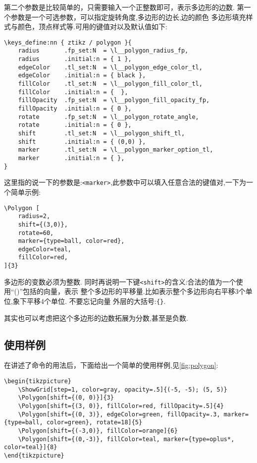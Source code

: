 \documentclass[
  hyper,    
  lang=cn,
  class=book,
  bib_index={load},
  mathSpec={envStyle=leftbar, alias},
  toc={column=2, title=目录},
]{zlatex}
\let\cmd\zlatexVerb
\newcommand{\zkey}[1]{\texttt{<#1>}}
\begin{document}
第二个参数是比较简单的，只需要输入一个正整数即可，表示多边形的边数. 第一个参数是一个可选参数，可以指定旋转角度,多边形的边长,边的颜色
多边形填充样式与颜色，顶点样式等.可用的键值对以及默认值如下:

\begin{verbatim}
\keys_define:nn { ztikz / polygon }{
    radius       .fp_set:N  = \l__polygon_radius_fp,
    radius       .initial:n = { 1 },
    edgeColor    .tl_set:N  = \l__polygon_edge_color_tl,
    edgeColor    .initial:n = { black },
    fillColor    .tl_set:N  = \l__polygon_fill_color_tl,
    fillColor    .initial:n = {  },
    fillOpacity  .fp_set:N  = \l__polygon_fill_opacity_fp,
    fillOpacity  .initial:n = { 0 },
    rotate       .fp_set:N  = \l__polygon_rotate_angle,
    rotate       .initial:n = { 0 },
    shift        .tl_set:N  = \l__polygon_shift_tl,
    shift        .initial:n = { (0,0) },
    marker       .tl_set:N  = \l__polygon_marker_option_tl,
    marker       .initial:n = { },
}
\end{verbatim}

这里指的说一下的参数是:\zkey{marker},此参数中可以填入任意合法的\cmd{<marker option>}键值对,一下为一个简单示例:
\begin{verbatim}
\Polygon [
    radius=2, 
    shift={(3,0)}, 
    rotate=60, 
    marker={type=ball, color=red}, 
    edgeColor=teal, 
    fillColor=red, 
]{3}
\end{verbatim}

\begin{remark}
  多边形的变数必须为整数. 同时再说明一下键\zkey{shift}的含义:合法的值为一个使用``()''包括的向量，表示 
  整个多边形的平移量.比如\cmd{shift={(3,-4)}}表示整个多边形向右平移3个单位,象下平移4个单位. 不要忘记向量
  外层的大括号:\texttt{\{\}}. 
\end{remark}

\begin{remark}
  其实也可以考虑把这个多边形的边数拓展为分数,甚至是负数.
\end{remark}

\subsection{使用样例}
在讲述了\cmd{\Polygon}命令的用法后，下面给出一个简单的使用样例,见\cref{fig:polygon}:
\begin{verbatim}
\begin{tikzpicture}
    \ShowGrid[step=1, color=gray, opacity=.5]{(-5, -5); (5, 5)}
    \Polygon[shift={(0, 0)}]{3}
    \Polygon[shift={(3, 0)}, fillColor=red, fillOpacity=.5]{4}
    \Polygon[shift={(0, 3)}, edgeColor=green, fillOpacity=.3, marker={type=ball, color=green}, rotate=18]{5}
    \Polygon[shift={(-3,0)}, fillColor=orange]{6}
    \Polygon[shift={(0,-3)}, fillColor=teal, marker={type=oplus*, color=teal}]{8}
\end{tikzpicture}
\end{verbatim}
\end{document}
